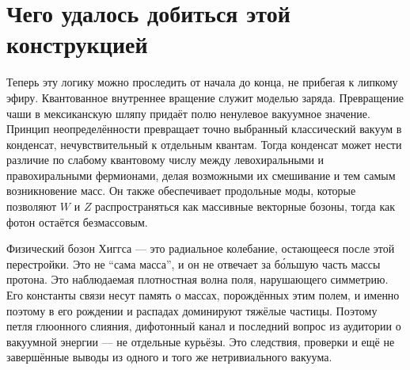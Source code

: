\begin{classroomqa}
\end{classroomqa}

\begin{classroomqa}
\end{classroomqa}

\section{Чего удалось добиться этой конструкцией}

Теперь эту логику можно проследить от начала до конца, не прибегая к липкому эфиру. Квантованное внутреннее вращение служит моделью заряда. Превращение чаши в мексиканскую шляпу придаёт полю ненулевое вакуумное значение. Принцип неопределённости превращает точно выбранный классический вакуум в конденсат, нечувствительный к отдельным квантам. Тогда конденсат может нести различие по слабому квантовому числу между левохиральными и правохиральными фермионами, делая возможными их смешивание и тем самым возникновение масс. Он также обеспечивает продольные моды, которые позволяют $W$ и $Z$ распространяться как массивные векторные бозоны, тогда как фотон остаётся безмассовым.

Физический бозон Хиггса — это радиальное колебание, остающееся после этой перестройки. Это не ``сама масса'', и он не отвечает за бо́льшую часть массы протона. Это наблюдаемая плотностная волна поля, нарушающего симметрию. Его константы связи несут память о массах, порождённых этим полем, и именно поэтому в его рождении и распадах доминируют тяжёлые частицы. Поэтому петля глюонного слияния, дифотонный канал и последний вопрос из аудитории о вакуумной энергии — не отдельные курьёзы. Это следствия, проверки и ещё не завершённые выводы из одного и того же нетривиального вакуума.

